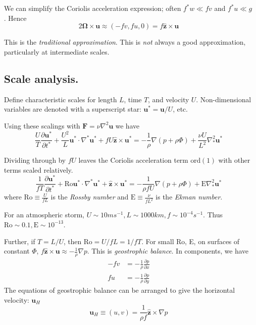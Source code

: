 \documentclass{jknotes}
\newcommand{\Ro}{Ro}
\newcommand{\Ek}{E}
\begin{document}
We can simplify the Coriolis acceleration expression; often $f^* w \ll f v$
and $f^* u \ll g$. Hence
\begin{equation}
	2 \bm{\Omega} \times \bm{u} \approx (-fv, fu, 0) = f \hat{\bm{z}} \times
	\bm{u}
\end{equation}

This is the \emph{traditional approximation}. This is \emph{not} always a good
approximation, particularly at intermediate scales.

\subsection{Scale analysis.}
Define characteristic scales for length $L$, time $T$, and velocity $U$.
Non-dimensional variables are denoted with a superscript star: $\bm{u}^* =
\bm{u}/U$, etc.

Using these scalings with $\bm{F} = \nu \nabla^2 \bm{u}$ we have
\begin{equation}
	\frac{U}{T} \frac{\partial \bm{u}^*}{\partial t^*} + \frac{U^2}{L}
	\bm{u}^* \cdot \nabla^* \bm{u}^* + fU \hat{\bm{z}} \times \bm{u}^* =
	-\frac{1}{\rho} \nabla \left(p + \rho \Phi\right) + \frac{\nu U}{L^2} \nabla_*^2
		\bm{u}^*
\end{equation}

Dividing through by $fU$ leaves the Coriolis acceleration term $\text{ord}(1)$ with
other terms scaled relatively.
\begin{equation}
	\frac{1}{fT} \frac{\partial \bm{u}^*}{\partial t^*} + \text{Ro}	\bm{u}^*
	\cdot \nabla^* \bm{u}^* + \hat{\bm{z}} \times \bm{u}^* =
	-\frac{1}{\rho f U} \nabla \left(p + \rho \Phi\right) + \text{E} \nabla_*^2
		\bm{u}^*
\end{equation}
where $\text{Ro} \equiv \frac{U}{fL}$ is the \emph{Rossby number} and
$\text{E} \equiv \frac{\nu}{fL^2}$ is the \emph{Ekman number}.

\begin{eg}
	For an atmospheric storm, $U \sim 10 m s^{-1}, L \sim 1000 km, f \sim
	10^{-4} s^{-1}$. Thus $\text{Ro} \sim 0.1, \text{E} \sim 10^{-13}$.
\end{eg}

Further, if $T = L/U$, then $\text{Ro} = U/fL = 1/fT$. For small \Ro, \Ek, 
on surfaces of constant $\Phi$, $f \hat{\bm{z}} \times \bm{u} \approx
-\frac{1}{\rho}\nabla p$.  This is \emph{geostrophic balance}. In components,
we have
\begin{equation}
	\begin{aligned}
		-fv &= -\frac{1}{\rho}\frac{\partial p}{\partial x} \\
		fu &= -\frac{1}{\rho}\frac{\partial p}{\partial y}
	\end{aligned}
\end{equation}
The equations of geostrophic balance can be arranged to give the horizontal
velocity:
$\bm{u}_H$
\begin{equation}
	\bm{u}_H \equiv (u,v) = \frac{1}{\rho f} \hat{\bm{z}} \times \nabla p
\end{equation}
\end{document}
